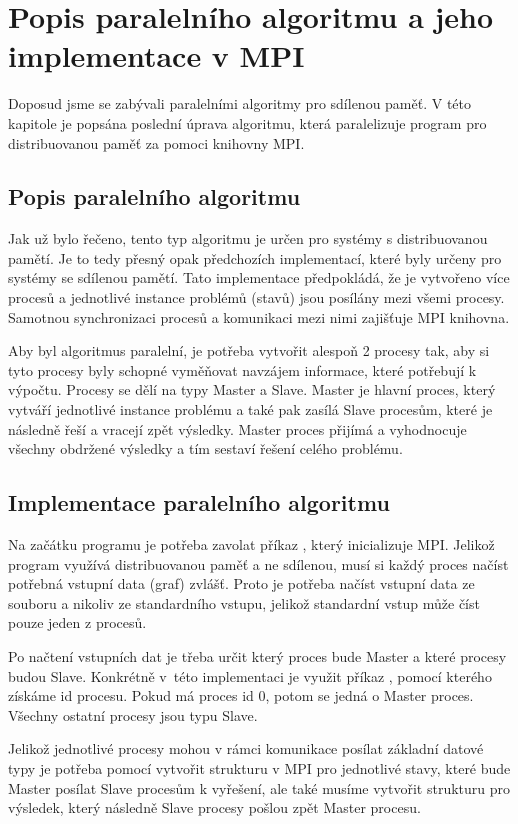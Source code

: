 \documentclass{article}
\begin{document}
\section{Popis paralelního algoritmu a jeho implementace v MPI}
Doposud jsme se zabývali paralelními algoritmy pro sdílenou paměť. V této kapitole je popsána poslední úprava algoritmu, která paralelizuje program pro distribuovanou paměť za pomoci knihovny MPI.

\subsection{Popis paralelního algoritmu}

Jak už bylo řečeno, tento typ algoritmu je určen pro systémy s distribuovanou pamětí. Je to tedy přesný opak předchozích implementací, které byly určeny pro systémy se sdílenou pamětí. Tato implementace předpokládá, že je vytvořeno více procesů a jednotlivé instance problémů (stavů) jsou posílány mezi všemi procesy. Samotnou synchronizaci procesů a komunikaci mezi nimi zajišťuje MPI knihovna.

Aby byl algoritmus paralelní, je potřeba vytvořit alespoň 2 procesy tak, aby si tyto procesy byly schopné vyměňovat navzájem informace, které potřebují k výpočtu. Procesy se dělí na typy Master a Slave. Master je hlavní proces, který vytváří jednotlivé instance problému a také pak zasílá Slave procesům, které je následně řeší a vracejí zpět výsledky. Master proces přijímá a vyhodnocuje všechny obdržené výsledky a tím sestaví řešení celého problému.

\subsection{Implementace paralelního algoritmu}
Na začátku programu je potřeba zavolat příkaz , který inicializuje MPI. Jelikož program využívá distribuovanou paměť a ne sdílenou, musí si každý proces načíst potřebná vstupní data (graf) zvlášť. Proto je potřeba načíst vstupní data ze souboru a nikoliv ze standardního vstupu, jelikož standardní vstup může číst pouze jeden z procesů. 

Po načtení vstupních dat je třeba určit který proces bude Master a které procesy budou Slave. Konkrétně v~této implementaci je využit příkaz , pomocí kterého získáme id procesu. Pokud má proces id 0, potom se jedná o Master proces. Všechny ostatní procesy jsou typu Slave. 

Jelikož jednotlivé procesy mohou v rámci komunikace posílat základní datové typy je potřeba pomocí  vytvořit strukturu v MPI pro jednotlivé stavy, které bude Master posílat Slave procesům k vyřešení, ale také musíme vytvořit strukturu pro výsledek, který následně Slave procesy pošlou zpět Master procesu.
\end{document}
